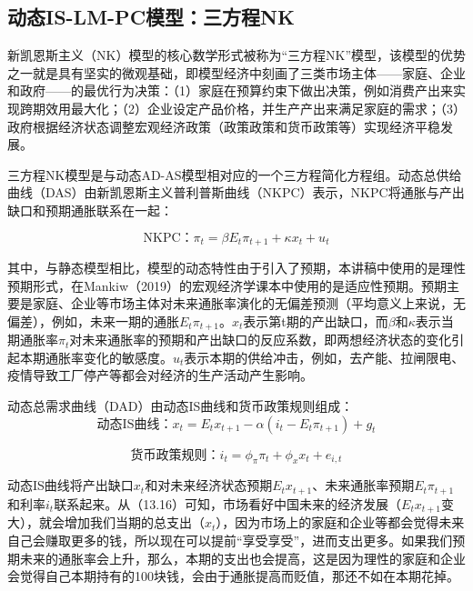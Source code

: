 \documentclass[cn,12pt,math=newtx,citestyle=gb7714-2015,bibstyle=gb7714-2015]{elegantbook}
\begin{document}
	\subsection{动态IS-LM-PC模型：三方程NK}
	
	新凯恩斯主义（NK）模型的核心数学形式被称为“三方程NK”模型，该模型的优势之一就是具有坚实的微观基础，即模型经济中刻画了三类市场主体——家庭、企业和政府——的最优行为决策：（1）家庭在预算约束下做出决策，例如消费产出来实现跨期效用最大化；（2）企业设定产品价格，并生产产出来满足家庭的需求；（3）政府根据经济状态调整宏观经济政策（政策政策和货币政策等）实现经济平稳发展。
	
	三方程NK模型是与动态AD-AS模型相对应的一个三方程简化方程组。动态总供给曲线（DAS）由新凯恩斯主义普利普斯曲线（NKPC）表示，NKPC将通胀与产出缺口和预期通胀联系在一起：
	
	\begin{equation}
		\text{NKPC：}\pi_t =\beta E_t \pi_{t+1} + \kappa x_t + u_t
	\end{equation}

    其中，与静态模型相比，模型的动态特性由于引入了预期，本讲稿中使用的是理性预期形式，在Mankiw（2019）的宏观经济学课本中使用的是适应性预期。预期主要是家庭、企业等市场主体对未来通胀率演化的无偏差预测（平均意义上来说，无偏差），例如，未来一期的通胀$E_t \pi_{t+1}$。$x_t$表示第t期的产出缺口，而$\beta$和$\kappa$表示当期通胀率$\pi_t$对未来通胀率的预期和产出缺口的反应系数，即两想经济状态的变化引起本期通胀率变化的敏感度。$u_t$表示本期的供给冲击，例如，去产能、拉闸限电、疫情导致工厂停产等都会对经济的生产活动产生影响。
    
    动态总需求曲线（DAD）由动态IS曲线和货币政策规则组成：
    	\begin{equation}
    	\text{动态IS曲线：}x_t = E_t x_{t+1} - \alpha(i_t - E_t\pi_{t+1} )+ g_t
    \end{equation}
    
    \begin{equation}
    	\text{货币政策规则：} i_t =\phi_\pi \pi_{t} + \phi_x x_t + e_{i,t}
    \end{equation}

    动态IS曲线将产出缺口$x_t$和对未来经济状态预期$E_t x_{t+1}$、未来通胀率预期$E_t\pi_{t+1} $和利率$i_t$联系起来。从（13.16）可知，市场看好中国未来的经济发展（$E_t x_{t+1}$变大），就会增加我们当期的总支出（$x_t$），因为市场上的家庭和企业等都会觉得未来自己会赚取更多的钱，所以现在可以提前“享受享受”，进而支出更多。如果我们预期未来的通胀率会上升，那么，本期的支出也会提高，这是因为理性的家庭和企业会觉得自己本期持有的100块钱，会由于通胀提高而贬值，那还不如在本期花掉。
    
\end{document}
